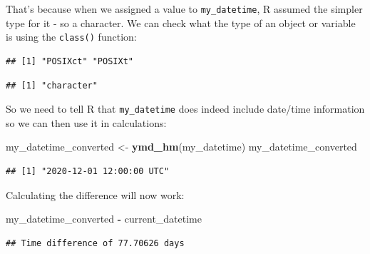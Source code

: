 \documentclass[
  12pt,
  krantz2]{krantz}
\makeatletter
\newenvironment{Shaded}{\begin{snugshade}}{\end{snugshade}}
\newcommand{\KeywordTok}[1]{\textcolor[rgb]{0.13,0.29,0.53}{\textbf{#1}}}
\newcommand{\NormalTok}[1]{#1}
\newcommand{\OperatorTok}[1]{\textcolor[rgb]{0.81,0.36,0.00}{\textbf{#1}}}
\newcommand{\StringTok}[1]{\textcolor[rgb]{0.31,0.60,0.02}{#1}}
\newenvironment{kframe}{%
\medskip{}
\setlength{\fboxsep}{.8em}
 \def\at@end@of@kframe{}%
 \ifinner\ifhmode%
  \def\at@end@of@kframe{\end{minipage}}%
  \begin{minipage}{\columnwidth}%
 \fi\fi%
 \def\FrameCommand##1{\hskip\@totalleftmargin \hskip-\fboxsep
 \colorbox{shadecolor}{##1}\hskip-\fboxsep
     \hskip-\linewidth \hskip-\@totalleftmargin \hskip\columnwidth}%
 \MakeFramed {\advance\hsize-\width
   \@totalleftmargin\z@ \linewidth\hsize
   \@setminipage}}%
 {\par\unskip\endMakeFramed%
 \at@end@of@kframe}
\renewenvironment{Shaded}{\begin{kframe}}{\end{kframe}}
\makeatother
\begin{document}
That's because when we assigned a value to \texttt{my\_datetime}, R assumed the simpler type for it - so a character.
We can check what the type of an object or variable is using the \texttt{class()} function:

\begin{Shaded}
\end{Shaded}

\begin{verbatim}
## [1] "POSIXct" "POSIXt"
\end{verbatim}

\begin{Shaded}
\end{Shaded}

\begin{verbatim}
## [1] "character"
\end{verbatim}

So we need to tell R that \texttt{my\_datetime} does indeed include date/time information so we can then use it in calculations:

\begin{Shaded}
\begin{Highlighting}[]
\NormalTok{my_datetime_converted <-}\StringTok{ }\KeywordTok{ymd_hm}\NormalTok{(my_datetime)}
\NormalTok{my_datetime_converted}
\end{Highlighting}
\end{Shaded}

\begin{verbatim}
## [1] "2020-12-01 12:00:00 UTC"
\end{verbatim}

Calculating the difference will now work:

\begin{Shaded}
\begin{Highlighting}[]
\NormalTok{my_datetime_converted }\OperatorTok{-}\StringTok{ }\NormalTok{current_datetime}
\end{Highlighting}
\end{Shaded}

\begin{verbatim}
## Time difference of 77.70626 days
\end{verbatim}
\end{document}
